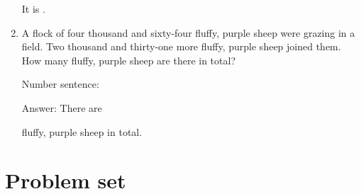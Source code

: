 \documentclass{tufte-book}
\begin{document}
\begin{enumerate}
It is \dotfill\medskip.

\item
  A flock of four thousand and sixty-four fluffy, purple sheep were
  grazing in a field. Two thousand and thirty-one more fluffy, purple
  sheep joined them. How many fluffy, purple sheep are there in total?\medskip\par
  Number sentence:
  \dotfill\medskip\par
  Answer: There are
  \dotfill\medskip\par\mbox{}\dotfill\medskip\par\mbox{}\dotfill\bigskip
  fluffy, purple sheep in total.

\end{enumerate}


\clearpage\section{Problem set }
\end{document}
